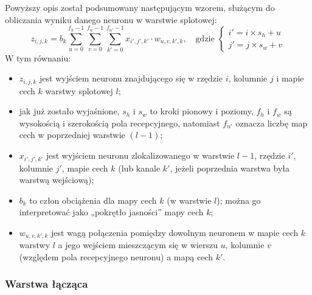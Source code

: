 \documentclass[12pt]{mwbk}
\theoremstyle{plain}
\theoremstyle{definition}
\theoremstyle{remark}
\begin{document}
Powyższy opis został podsumowany następującym wzorem, służącym do obliczania wyniku danego neuronu w warstwie splotowej:
$$z_{i,j,k}=b_k\sum_{u=0}^{f_h-1}\sum_{v=0}^{f_w-1}\sum_{k'=0}^{f_{n'}-1}x_{i', j', k'} \cdot w_{u,v,k', k},\text{~~~gdzie }\begin{cases}
i'=i \times s_h+u\\
j'=j \times s_w+v
\end{cases}$$
W tym równaniu:
\begin{itemize}
	\item $z_{i,j,k}$ jest wyjściem neuronu znajdującego się w rzędzie $i$, kolumnie $j$ i mapie cech $k$ warstwy
	splotowej $l$;
	\item jak już zostało wyjaśnione, $s_h$ i $s_w$ to kroki pionowy i poziomy, $f_h$ i $f_w$ są wysokością i szerokością
	pola recepcyjnego, natomiast $f_{n'}$ oznacza liczbę map cech w poprzedniej warstwie $(l-1)$;
	\item $x_{i',j',k'}$ jest wyjściem neuronu zlokalizowanego w warstwie $l-1$, rzędzie $i'$, kolumnie $j'$, mapie
	cech $k$ (lub kanale $k'$, jeżeli poprzednia warstwa była warstwą wejściową);
	\item $b_k$ to człon obciążenia dla mapy cech $k$ (w warstwie $l$); można go interpretować jako „pokrętło
	jasności” mapy cech $k$;
	\item $w_{u,v,k',k}$ jest wagą połączenia pomiędzy dowolnym neuronem w mapie cech $k$ warstwy $l$ a jego
	wejściem mieszczącym się w wierszu $u$, kolumnie $v$ (względem pola recepcyjnego neuronu)
	a mapą cech $k'$.
\end{itemize}



\subsubsection{Warstwa łącząca}
\end{document}
